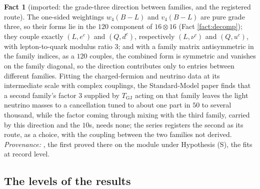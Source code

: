 \documentclass[11pt]{article}
\theoremstyle{definition}
\newtheorem{fact}[theorem]{Fact}
\begin{document}
\begin{fact}[imported: the grade-three direction between families, and the registered route]\label{fact:gradethree}
The one-sided weightings $w_{4}(B - L)$ and $v_{4}(B - L)$ are pure grade three, so their forms lie in the $120$ component of $16 \otimes 16$ (Fact \ref{fact:decomp}); they couple exactly $(L, e^{c})$ and $(Q, d^{c})$, respectively $(L, \nu^{c})$ and $(Q, u^{c})$, with lepton-to-quark modulus ratio $3$; and with a family matrix antisymmetric in the family indices, as a $120$ couples, the combined form is symmetric and vanishes on the family diagonal, so the direction contributes only to entries between different families. Fitting the charged-fermion and neutrino data at its intermediate scale with complex couplings, the Standard-Model paper finds that a second family's factor $3$ supplied by $T_{\mathrm{GJ}}$ acting on that family leaves the light neutrino masses to a cancellation tuned to about one part in $50$ to several thousand, while the factor coming through mixing with the third family, carried by this direction and the $10$s, needs none; the series registers the second as its route, as a choice, with the coupling between the two families not derived. \emph{Provenance:} \cite[Prop.~11.6, Obs.~11.7, Rem.~11.8]{ButlerT12}, the first proved there on the module under Hypothesis (S), the fits at record level.
\end{fact}


\subsection*{The levels of the results}
\end{document}
